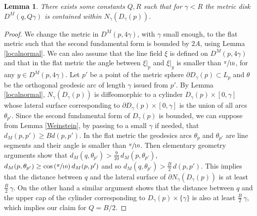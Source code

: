 \documentclass[JEP,XML,SOM,Unicode]{cedram}
\newtheorem{lemma}[theorem]{Lemma}
\theoremstyle{definition}
\theoremstyle{remark}
\numberwithin{equation}{section}
\begin{document}
\begin{lemma}\label{round}
There exists some constants $Q, R$ such that for $\gamma < R$
the metric disk $D^M(q,Q \gamma)$ is contained within $N_{\gamma}(D_{\gamma}(p))$.
\end{lemma}
\begin{proof}
We change the metric in $D^M(p,4\gamma)$, with $\gamma$ small enough, to the flat metric such that
the second fundamental form is bounded by $2A$, using Lemma \ref{localnormal}.
We can also assume that the line field $\xi$ is defined on $D^M(p,4\gamma)$ and that in the flat
metric the angle between $\xi|_p$ and $\xi|_y$ is smaller than $\sfrac{\pi}{10}$, for any $y\in D^M(p,4\gamma)$.
Let $p'$ be a point of the metric sphere $\partial D_{\gamma}(p)\subset L_p$ and $\theta$ be the
orthogonal geodesic arc of length $\gamma$ issued from $p'$.
By Lemma \ref{localnormal}, $N_{\gamma}(D_{\gamma}(p))$ is diffeomorphic to a cylinder
$D_{\gamma}(p)\times [0,\gamma]$ whose lateral surface corresponding to
$\partial D_{\gamma}(p)\times [0,\gamma]$ is the union of all arcs $\theta_{p'}$. Since the second fundamental form of $D_{\gamma}(p)$ is bounded,
we can suppose from Lemma \ref{Weinstein}, by passing to a small $\gamma$ if needed, that
$d_M(p,p')\geq B d(p,p')$.
In the flat metric the geodesics arcs $\theta_p$ and $\theta_{p'}$ are line segments and their angle
is smaller than $\sfrac{\pi}{10}$. Then elementary geometry arguments show that
$d_M(q,\theta_{p'}) > \frac{9}{10}\,d_M(p,\theta_{p'})$,
$d_M(p,\theta_{p'})\geq \cos\left(\sfrac{\pi}{10}\right)d_M(p,p')$
and so $d_{M}(q, \theta_{p'}) > \frac{B}{2}\, d(p,p')$. This implies that the distance between $q$ and the
lateral surface of $\partial N_{\gamma}(D_{\gamma}(p))$ is at least $\frac{B}{2}\,\gamma$. On the other hand
a similar argument shows that the distance between $q$ and the upper cap of the cylinder
corresponding to $D_{\gamma}(p)\times \{\gamma\}$ is also at least $\frac{B}{2}\,\gamma$, which implies our claim
for $Q=B/2$.
\end{proof}

\end{document}
